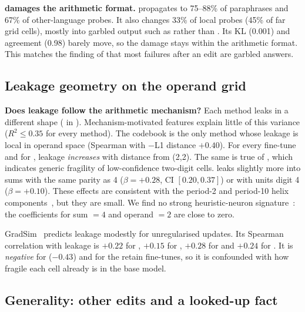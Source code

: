 {\bf \rome damages the arithmetic format.} \rome propagates to 75--88\% of paraphrases and 67\% of other-language probes. It also changes 33\% of local probes (45\% of far grid cells), mostly into garbled output such as  rather than . Its \wikitext KL (0.001) and \mmlu agreement (0.98) barely move, so the damage stays within the arithmetic format. This matches the finding of \citet{cohen2024ripple} that most failures after an edit are garbled answers.

\subsection{Leakage geometry on the operand grid}
\label{sec:geometry}

{\bf Does leakage follow the arithmetic mechanism?} Each method leaks in a different shape ( in ). Mechanism-motivated features explain little of this variance ($R^2\le0.35$ for every method). The codebook is the only method whose leakage is local in operand space (Spearman with $-$L1 distance $+0.40$). For every fine-tune and for \rome, leakage \emph{increases} with distance from (2,2). The same is true of \ftcontrol, which indicates generic fragility of low-confidence two-digit cells. \ftexact leaks slightly more into sums with the same parity as 4 ($\beta=+0.28$, CI $[0.20,0.37]$) or with units digit 4 ($\beta=+0.10$). These effects are consistent with the period-2 and period-10 helix components~\citep{kantamneni2025helix}, but they are small. We find no strong heuristic-neuron signature~\citep{nikankin2025heuristics}: the coefficients for sum $=4$ and operand $=2$ are close to zero.

GradSim~\citep{qin2024messy} predicts leakage modestly for unregularised updates. Its Spearman correlation with leakage is $+0.22$ for \ftexact, $+0.15$ for \ftpara, $+0.28$ for \ftentail and $+0.24$ for \cbone. It is \emph{negative} for \ftcontrol ($-0.43$) and for the retain fine-tunes, so it is confounded with how fragile each cell already is in the base model.

\subsection{Generality: other edits and a looked-up fact}
\label{sec:generality}



